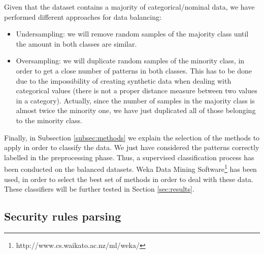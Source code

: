 \documentclass{llncs}
\begin{document}
Given that the dataset contains a majority of categorical/nominal data, we have performed different approaches for data balancing:
\begin{itemize}
\item Undersampling: we will remove random samples of the majority class until the amount in both classes are similar.
\item Oversampling: we will duplicate random samples of the minority class, in order to get a close number of patterns in both classes. This has to be done due to the impossibility of creating synthetic data when dealing with categorical values (there is not a proper distance measure between two values in a category). Actually, since the number of samples in the majority class is almost twice the minority one, we have just duplicated all of those belonging to the minority class.
\end{itemize}

Finally, in Subsection \ref{subsec:methods} we explain the selection of the methods to apply in order to classify the data. We just have considered the patterns correctly labelled in the preprocessing phase. Thus, a supervised classification process \cite{classification_67} has been conducted on the balanced datasets.
Weka Data Mining Software\footnote{http://www.cs.waikato.ac.nz/ml/weka/} has been used, in order to select the best set of methods in order to deal with these data. These classifiers will be further tested in Section \ref{sec:results}.

%
\subsection{Security rules parsing}
\label{subsec:ruleparsing}
\end{document}
